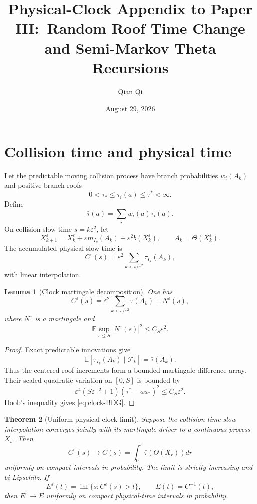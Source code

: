 \documentclass[11pt,reqno]{amsart}
\title{Physical-Clock Appendix to Paper III:\ Random Roof Time Change and Semi-Markov Theta Recursions}
\author{Qian Qi}
\date{August 29, 2026}
\newtheorem{theorem}{Theorem}[section]
\newtheorem{lemma}[theorem]{Lemma}
\theoremstyle{definition}
\newcommand{\E}{\mathbb E}
\newcommand{\F}{\mathcal F}
\newcommand{\abs}[1]{\left\lvert#1\right\rvert}
\begin{document}
\maketitle

\section{Collision time and physical time}

Let the predictable moving collision process have branch probabilities
$w_i(A_k)$ and positive branch roofs
\[
 0<\tau_*\le\tau_i(a)\le\tau^*<\infty.
\]
Define
\[
 \bar\tau(a)=\sum_iw_i(a)\tau_i(a).
\]
On collision slow time $s=k\varepsilon^2$, let
\begin{equation}\label{eq:collision-recursion}
 X_{k+1}^\varepsilon=X_k^\varepsilon
 +\varepsilon m_{I_k}(A_k)+\varepsilon^2b(X_k^\varepsilon),
 \qquad A_k=\Theta(X_k^\varepsilon).
\end{equation}
The accumulated physical slow time is
\begin{equation}\label{eq:clock}
 C^\varepsilon(s)=
 \varepsilon^2\sum_{k<s/\varepsilon^2}\tau_{I_k}(A_k),
\end{equation}
with linear interpolation.

\begin{lemma}[Clock martingale decomposition]\label{lem:clock-decomp}
One has
\begin{equation}\label{eq:clock-decomp}
 C^\varepsilon(s)=
 \varepsilon^2\sum_{k<s/\varepsilon^2}\bar\tau(A_k)
 +N^\varepsilon(s),
\end{equation}
where $N^\varepsilon$ is a martingale and
\begin{equation}\label{eq:clock-BDG}
 \E\sup_{s\le S}\abs{N^\varepsilon(s)}^2
 \le C_S\varepsilon^2.
\end{equation}
\end{lemma}

\begin{proof}
Exact predictable innovations give
\[
 \E[\tau_{I_k}(A_k)\mid\F_k]=\bar\tau(A_k).
\]
Thus the centered roof increments form a bounded martingale difference array.
Their scaled quadratic variation on $[0,S]$ is bounded by
\[
 \varepsilon^4(S\varepsilon^{-2}+1)(\tau^*-	au_*)^2
 \le C_S\varepsilon^2.
\]
Doob's inequality gives \eqref{eq:clock-BDG}.
\end{proof}

\begin{theorem}[Uniform physical-clock limit]\label{thm:clock-limit}
Suppose the collision-time slow interpolation converges jointly with its
martingale driver to a continuous process $X_s$.  Then
\begin{equation}\label{eq:clock-limit}
 C^\varepsilon(s)\longrightarrow
 C(s)=\int_0^s\bar\tau(\Theta(X_r))dr
\end{equation}
uniformly on compact intervals in probability.  The limit is strictly
increasing and bi-Lipschitz.  If
\[
 E^\varepsilon(t)=\inf\{s:C^\varepsilon(s)>t\},
 \qquad
 E(t)=C^{-1}(t),
\]
then $E^\varepsilon\to E$ uniformly on compact physical-time intervals in
probability.
\end{theorem}
\end{document}
